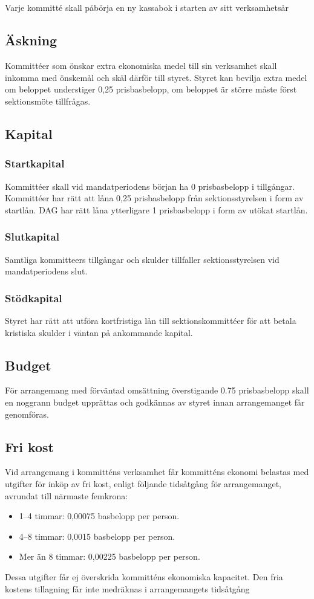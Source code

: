 \documentclass[a4paper, 10pt]{article}
\begin{document}
\subsection{}
Varje kommitté skall påbörja en ny kassabok i starten av sitt verksamhetsår
\subsection{Äskning}
Kommittéer som önskar extra ekonomiska medel till sin verksamhet skall inkomma med önskemål och skäl därför till styret. Styret kan bevilja extra medel om beloppet understiger 0,25 prisbasbelopp, om beloppet är större måste först sektionsmöte tillfrågas.
\subsection{Kapital}
\label{sec:sektionsforeningar_startkapital}
\subsubsection{Startkapital}
Kommittéer skall vid mandatperiodens början ha 0 prisbasbelopp i tillgångar. Kommittéer har rätt att låna 0,25 prisbasbelopp från sektionsstyrelsen i form av startlån. DAG har rätt låna ytterligare 1 prisbasbelopp i form av utökat startlån.
\subsubsection{Slutkapital}
Samtliga kommitteers tillgångar och skulder tillfaller sektionsstyrelsen vid mandatperiodens slut.
\subsubsection{Stödkapital}
Styret har rätt att utföra kortfristiga lån till sektionskommittéer för att betala kristiska skulder i väntan på ankommande kapital.
\subsection{Budget}
För arrangemang med förväntad omsättning överstigande 0.75 prisbasbelopp skall en noggrann budget upprättas och godkännas av styret innan arrangemanget får genomföras.
\subsection{Fri kost}
Vid arrangemang i kommitténs verksamhet får kommitténs ekonomi belastas med utgifter för inköp av fri kost, enligt följande tidsåtgång för arrangemanget, avrundat till närmaste femkrona:
\begin{itemize}
    \item 1–4 timmar: 0,00075 basbelopp per person.
    \item 4–8 timmar: 0,0015 basbelopp per person.
    \item Mer än 8 timmar: 0,00225 basbelopp per person.
\end{itemize}
Dessa utgifter får ej överskrida kommitténs ekonomiska kapacitet. Den fria kostens tillagning får inte medräknas i arrangemangets tidsåtgång
\end{document}
